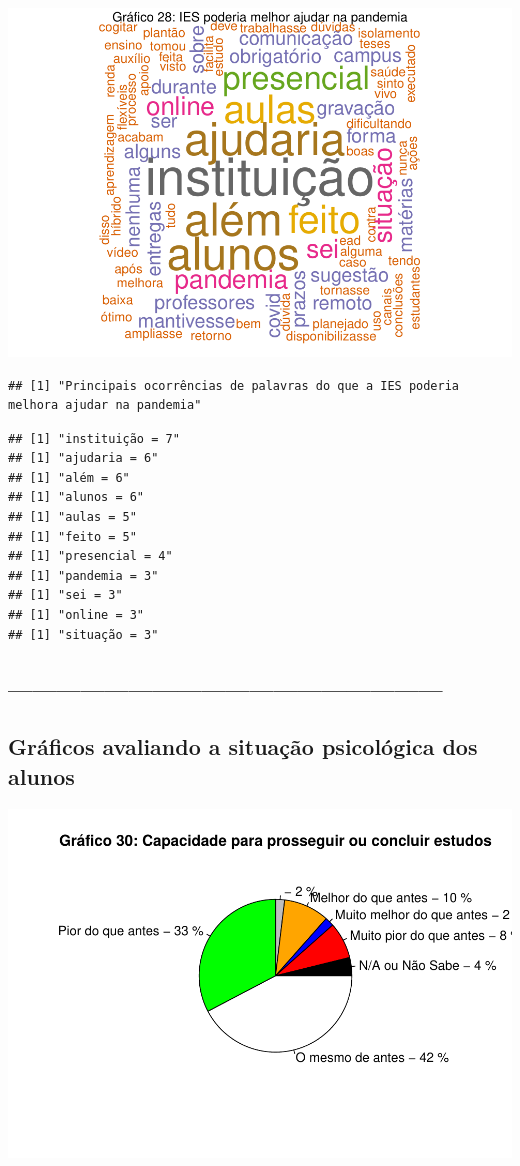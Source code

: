 \documentclass[
]{article}
\begin{document}
\includegraphics{consequencias-oriundas-da-pandemia-v1.0_files/figure-latex/grafico-28-1.pdf}

\begin{verbatim}
## [1] "Principais ocorrências de palavras do que a IES poderia melhora ajudar na pandemia"
\end{verbatim}

\begin{verbatim}
## [1] "instituição = 7"
## [1] "ajudaria = 6"
## [1] "além = 6"
## [1] "alunos = 6"
## [1] "aulas = 5"
## [1] "feito = 5"
## [1] "presencial = 4"
## [1] "pandemia = 3"
## [1] "sei = 3"
## [1] "online = 3"
## [1] "situação = 3"
\end{verbatim}

\hypertarget{section-1}{%
\subsection{------------------------------------------------------}\label{section-1}}

\hypertarget{gruxe1ficos-avaliando-a-situauxe7uxe3o-psicoluxf3gica-dos-alunos}{%
\subsection{Gráficos avaliando a situação psicológica dos
alunos}\label{gruxe1ficos-avaliando-a-situauxe7uxe3o-psicoluxf3gica-dos-alunos}}

\includegraphics{consequencias-oriundas-da-pandemia-v1.0_files/figure-latex/grafico-nono-1.pdf}
\end{document}
